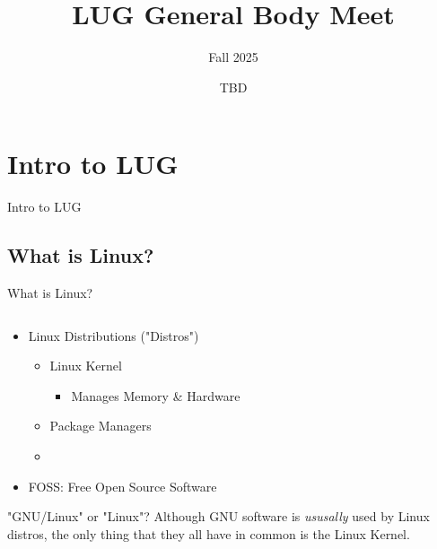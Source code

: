 \documentclass{beamer}
\title{LUG General Body Meet}
\subtitle{Fall 2025}
\date{TBD}
\institute{Linux Users Group @ UIC}
\begin{document}
  \begin{frame}
    \maketitle
  \end{frame}

  \begin{frame}
    \tableofcontents
  \end{frame}
  
  \section{Intro to LUG}
  \begin{frame}

    {\Huge Intro to LUG}
  \end{frame}

  \subsection{What is Linux?}
  \begin{frame}{What is Linux?}
    \begin{columns}
      \begin{column}{0.6\textwidth}
        \begin{itemize}
          \item Linux Distributions ("Distros")
          \begin{itemize}
            \item Linux Kernel
            \begin{itemize}
              \item Manages Memory \& Hardware 
            \end{itemize}
            \item Package Managers
            \item 
          \end{itemize}
          \item FOSS: Free Open Source Software
        \end{itemize}
        \begin{block}{"GNU/Linux" or "Linux"?}
          Although GNU software is \emph{ususally} used by Linux distros, the only thing that they all have in common is the Linux Kernel.
        \end{block}
      \end{column}
      \begin{column}{0.4\textwidth}
        
      \end{column}
    \end{columns}
  \end{frame}
\end{document}
